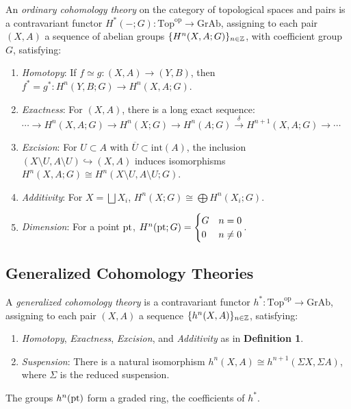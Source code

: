 \documentclass{article}
\begin{document}
\begin{definition}
An \emph{ordinary cohomology theory} on the category of topological spaces and pairs is a contravariant functor \( H^*(-; G): \text{Top}^{\text{op}} \to \text{GrAb} \), assigning to each pair \( (X, A) \) a sequence of abelian groups \( \{ H^n(X, A; G) \}_{n \in \mathbb{Z}} \), with coefficient group \( G \), satisfying:
\begin{enumerate}
    \item \emph{Homotopy}: If \( f \simeq g: (X, A) \to (Y, B) \), then \( f^* = g^*: H^n(Y, B; G) \to H^n(X, A; G) \).
    \item \emph{Exactness}: For \( (X, A) \), there is a long exact sequence: \( \cdots \to H^n(X, A; G) \to H^n(X; G) \to H^n(A; G) \xrightarrow{\delta} H^{n+1}(X, A; G) \to \cdots \)
    \item \emph{Excision}: For \( U \subset A \) with \( \overline{U} \subset \text{int}(A) \), the inclusion \( (X \setminus U, A \setminus U) \hookrightarrow (X, A) \) induces isomorphisms \( H^n(X, A; G) \cong H^n(X \setminus U, A \setminus U; G) \).
    \item \emph{Additivity}: For \( X = \bigsqcup X_i \), \( H^n(X; G) \cong \bigoplus H^n(X_i; G) \).
    \item \emph{Dimension}: For a point \( \text{pt} \), \( H^n(\text{pt}; G) = \begin{cases} G & n = 0 \\ 0 & n \neq 0 \end{cases} \).
\end{enumerate}
\end{definition}

\subsection{Generalized Cohomology Theories}

\begin{definition}
A \emph{generalized cohomology theory} is a contravariant
functor \( h^*: \text{Top}^{\text{op}} \to \text{GrAb} \),
assigning to each pair \( (X, A) \) a
sequence \( \{ h^n(X, A) \}_{n \in \mathbb{Z}} \), satisfying:
\begin{enumerate}
    \item \emph{Homotopy}, \emph{Exactness}, \emph{Excision}, and \emph{Additivity} as in \textbf{Definition 1}.
    \item \emph{Suspension}: There is a natural isomorphism \( h^n(X, A) \cong h^{n+1}(\Sigma X, \Sigma A) \), where \( \Sigma \) is the reduced suspension.
\end{enumerate}
The groups \( h^n(\text{pt}) \) form a graded ring, the coefficients of \( h^* \).
\end{definition}
\end{document}

